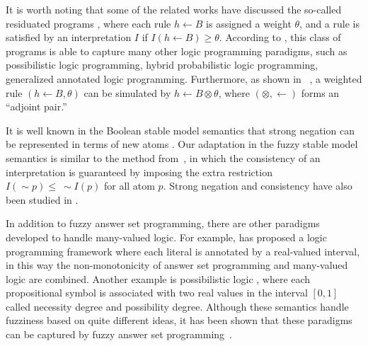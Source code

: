 \documentclass[runningheads]{llncs}
\def\sneg{\sim\!\!}
\def\fand{\otimes}
\begin{document}
It is worth noting that some of the related works have discussed
the so-called residuated programs
\cite{vojtas01fuzzy,damasio01monotonic,medina01multi-adjoint,madrid08towards}, where each rule $h
\leftarrow B$ is assigned a weight $\theta$, and a rule is satisfied by an
interpretation $I$ if $I(h \leftarrow B) \geq \theta$. According to
\cite{damasio01monotonic}, this class of programs is able to
capture many other logic programming paradigms, such as possibilistic
logic programming, hybrid probabilistic logic programming, generalized
annotated logic programming. Furthermore, as shown in
~\cite{damasio01monotonic}, a weighted rule $(h \leftarrow B,
\theta)$ can be simulated by $h \leftarrow B \fand \theta$, where
$(\fand, \leftarrow)$ forms an ``adjoint pair.''



It is well known in the Boolean stable model semantics that strong
negation can be represented in terms of new atoms
\cite{ferraris11stable}. 
Our adaptation in the fuzzy stable model semantics is similar to the
method from~\cite{madrid08towards}, in which the consistency of an interpretation is guaranteed by imposing the extra restriction $I(\sneg p) \leq\ \sneg I(p)$ for all atom $p$. Strong negation and consistency have also been studied in \cite{madrid11measuring,madrid09oncoherence}.

\BOCC
In addition to fuzzy answer set programming, there are other paradigms
developed to handle many-valued logic. For example,
\cite{straccia06annotated} has proposed a logic programming framework
where each literal is annotated by a real-valued interval, in this way
the non-monotonicity of answer set programming and many-valued logic
are combined. Another example is possibilistic
logic \cite{dubois04possibilistic}, where each propositional
symbol is associated with two real values in the interval $\left[0,
  1\right]$ called necessity degree and possibility degree. Although
these semantics handle fuzziness based on quite different ideas, it
has been shown that these paradigms can be captured by fuzzy answer
set programming~\cite{damasio01monotonic}.
\EOCC

\vspace{-0.3cm}


\end{document}
